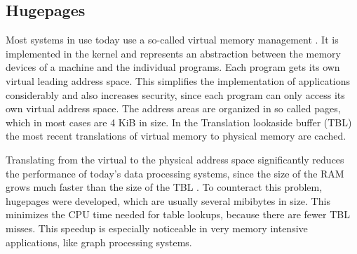 \subsection{Hugepages}
Most systems in use today use a so-called virtual memory management \cite{virtual_memory}.
It is implemented in the kernel and represents an abstraction between the memory devices of a machine and the individual programs.
Each program gets its own virtual leading address space.
This simplifies the implementation of applications considerably and also increases security, since each program can only access its own virtual address space.
The address areas are organized in so called pages, which in most cases are 4 KiB in size.
In the Translation lookaside buffer (TBL) the most recent translations of virtual memory to physical memory are cached.

Translating from the virtual to the physical address space significantly reduces the performance of today's data processing systems, since the size of the RAM grows much faster than the size of the TBL \cite{hugepages, superpages}.
To counteract this problem, hugepages were developed, which are usually several mibibytes in size.
This minimizes the CPU time needed for table lookups, because there are fewer TBL misses.
This speedup is especially noticeable in very memory intensive applications, like graph processing systems.

